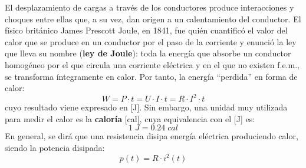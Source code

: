 	El desplazamiento de cargas a través de los conductores
        produce interacciones y choques entre ellas que, a su vez, dan
        origen a un calentamiento del conductor. El físico británico
        James Prescott Joule, en 1841, fue quién cuantificó el valor
        del calor que se produce en un conductor por el paso de la
        corriente y enunció la ley que lleva su nombre (\textbf{ley de
          Joule}): toda la energía que absorbe un conductor homogéneo
        por el que circula una corriente eléctrica y en el que no
        existen f.e.m., se transforma íntegramente en calor. Por
        tanto, la energía ``perdida'' en forma de calor:
	\begin{equation*}
          W=P\cdot t=U\cdot I\cdot t=R\cdot I^2\cdot t
	\end{equation*}
	cuyo resultado viene expresado en [J]. Sin embargo, una unidad
        muy utilizada para medir el calor es la \textbf{caloría}
        [cal], cuya equivalencia con el [J] es:
	\begin{equation*}
          1\;J=0.24\;cal
	\end{equation*}
	En general, se dirá que una resistencia disipa energía
        eléctrica produciendo calor, siendo la potencia disipada:
	\begin{equation*}
          p(t)=R\cdot i^{2}(t)
	\end{equation*}
	

